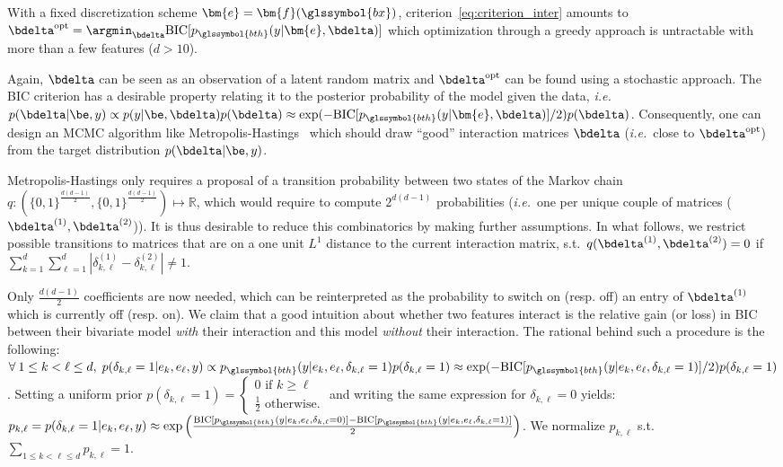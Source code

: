 With a fixed discretization scheme $\bm{e} = \bm{f}(\glssymbol{bx})$, criterion~\ref{eq:criterion_inter} amounts to $\bdelta^{\text{opt}} = \argmin_{\bdelta} \text{BIC}[p_{\glssymbol{bth}}(y|\bm{e},\bdelta)]$ which optimization through a greedy approach is untractable with more than a few features ($d > 10$).

Again, $\bdelta$ can be seen as an observation of a latent random matrix and $\bdelta^{\text{opt}}$ can be found using a stochastic approach. The BIC criterion has a desirable property relating it to the posterior probability of the model given the data, \textit{i.e.}\ $p(\bdelta | \be, y) \propto p(y | \be, \bdelta) p(\bdelta) \approx \exp(-\text{BIC}[p_{\glssymbol{bth}}(y|\bm{e},\bdelta)]/2)  p(\bdelta)$. Consequently, one can design an MCMC algorithm like Metropolis-Hastings~\cite{hastings1970monte} which should draw ``good'' interaction matrices $\bdelta$ (\textit{i.e.}\ close to $\bdelta^{\text{opt}}$) from the target distribution $p(\bdelta | \be, y)$.

Metropolis-Hastings only requires a proposal of a transition probability between two states of the Markov chain $q: ({\{0,1\}}^{\frac{d(d-1)}{2}},{\{0,1\}}^{\frac{d(d-1)}{2}}) \mapsto \mathbb{R}$, which would require to compute $2^{d(d-1)}$ probabilities (\textit{i.e.}\ one per unique couple of matrices ($\bdelta^{(1)},\bdelta^{(2)}$)). It is thus desirable to reduce this combinatorics by making further assumptions. In what follows, we restrict possible transitions to matrices that are on a one unit $L^1$ distance to the current interaction matrix, s.t.\ $q(\bdelta^{(1)},\bdelta^{(2)}) = 0$ if $\sum_{k=1}^d \sum_{\ell=1}^d |\delta^{(1)}_{k,\ell} - \delta^{(2)}_{k,\ell}| \neq 1$.

Only $\frac{d(d-1)}{2}$ coefficients are now needed, which can be reinterpreted as the probability to switch on (resp. off) an entry of $\bdelta^{(1)}$ which is currently off (resp. on). We claim that a good intuition about whether two features interact is the relative gain (or loss) in BIC between their bivariate model \textit{with} their interaction and this model \textit{without} their interaction. The rational behind such a procedure is the following: $\forall \: 1 \leq k < \ell \leq d, \; p(\delta_{k,\ell}=1 | e_k, e_{\ell}, y) \propto p_{\glssymbol{bth}}(y | e_k, e_{\ell}, \delta_{k,\ell}=1) p(\delta_{k,\ell}=1) \approx \exp(-\text{BIC}[p_{\glssymbol{bth}}(y | e_k, e_{\ell}, \delta_{k,\ell}=1)]/2) p(\delta_{k,\ell}=1)$. Setting a uniform prior $p(\delta_{k,\ell}=1) =\begin{cases} 0 \text{ if } k \geq \ell \\ \frac{1}{2} \text{ otherwise.} \end{cases}$ and writing the same expression for $\delta_{k,\ell} = 0$ yields: $p_{k,\ell} = p(\delta_{k,\ell}=1 | e_k, e_{\ell}, y) \approx \exp \left( \frac{\text{BIC}[p_{\glssymbol{bth}}(y | e_k, e_{\ell}, \delta_{k,\ell}=0)]-\text{BIC}[p_{\glssymbol{bth}}(y | e_k, e_{\ell}, \delta_{k,\ell}=1)]}{2} \right)$. We normalize $p_{k,\ell}$ s.t.\ $\sum_{1 \leq k < \ell \leq d} p_{k,\ell} = 1$.

